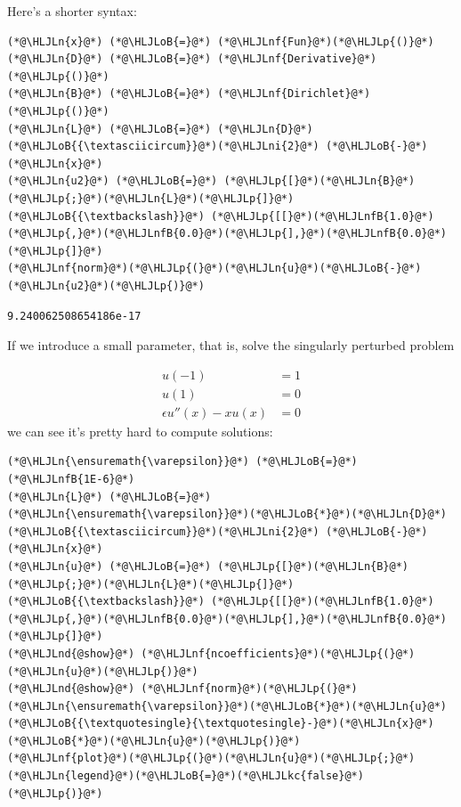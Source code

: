 \documentclass[12pt,a4paper]{article}
\newcommand{\HLJLkc}[1]{\textcolor[RGB]{59,151,46}{\textit{#1}}}
\newcommand{\HLJLn}[1]{#1}
\newcommand{\HLJLnd}[1]{\textcolor[RGB]{214,102,97}{#1}}
\newcommand{\HLJLnf}[1]{\textcolor[RGB]{66,102,213}{#1}}
\newcommand{\HLJLnfB}[1]{\textcolor[RGB]{59,151,46}{#1}}
\newcommand{\HLJLni}[1]{\textcolor[RGB]{59,151,46}{#1}}
\newcommand{\HLJLoB}[1]{\textcolor[RGB]{102,102,102}{\textbf{#1}}}
\newcommand{\HLJLp}[1]{#1}
\begin{document}
Here's a shorter syntax:


\begin{lstlisting}
(*@\HLJLn{x}@*) (*@\HLJLoB{=}@*) (*@\HLJLnf{Fun}@*)(*@\HLJLp{()}@*)
(*@\HLJLn{D}@*) (*@\HLJLoB{=}@*) (*@\HLJLnf{Derivative}@*)(*@\HLJLp{()}@*)
(*@\HLJLn{B}@*) (*@\HLJLoB{=}@*) (*@\HLJLnf{Dirichlet}@*)(*@\HLJLp{()}@*)
(*@\HLJLn{L}@*) (*@\HLJLoB{=}@*) (*@\HLJLn{D}@*)(*@\HLJLoB{{\textasciicircum}}@*)(*@\HLJLni{2}@*) (*@\HLJLoB{-}@*) (*@\HLJLn{x}@*)
(*@\HLJLn{u2}@*) (*@\HLJLoB{=}@*) (*@\HLJLp{[}@*)(*@\HLJLn{B}@*)(*@\HLJLp{;}@*)(*@\HLJLn{L}@*)(*@\HLJLp{]}@*) (*@\HLJLoB{{\textbackslash}}@*) (*@\HLJLp{[[}@*)(*@\HLJLnfB{1.0}@*)(*@\HLJLp{,}@*)(*@\HLJLnfB{0.0}@*)(*@\HLJLp{],}@*)(*@\HLJLnfB{0.0}@*)(*@\HLJLp{]}@*)
(*@\HLJLnf{norm}@*)(*@\HLJLp{(}@*)(*@\HLJLn{u}@*)(*@\HLJLoB{-}@*)(*@\HLJLn{u2}@*)(*@\HLJLp{)}@*)
\end{lstlisting}

\begin{lstlisting}
9.240062508654186e-17
\end{lstlisting}


If we introduce a small parameter, that is, solve the singularly perturbed problem


\begin{align*}
u(-1) &= 1\\
u(1) &= 0\\
\epsilon u''(x) - xu(x) &= 0
\end{align*}
we can see it's pretty hard to compute solutions:


\begin{lstlisting}
(*@\HLJLn{\ensuremath{\varepsilon}}@*) (*@\HLJLoB{=}@*) (*@\HLJLnfB{1E-6}@*)
(*@\HLJLn{L}@*) (*@\HLJLoB{=}@*) (*@\HLJLn{\ensuremath{\varepsilon}}@*)(*@\HLJLoB{*}@*)(*@\HLJLn{D}@*)(*@\HLJLoB{{\textasciicircum}}@*)(*@\HLJLni{2}@*) (*@\HLJLoB{-}@*) (*@\HLJLn{x}@*)
(*@\HLJLn{u}@*) (*@\HLJLoB{=}@*) (*@\HLJLp{[}@*)(*@\HLJLn{B}@*)(*@\HLJLp{;}@*)(*@\HLJLn{L}@*)(*@\HLJLp{]}@*) (*@\HLJLoB{{\textbackslash}}@*) (*@\HLJLp{[[}@*)(*@\HLJLnfB{1.0}@*)(*@\HLJLp{,}@*)(*@\HLJLnfB{0.0}@*)(*@\HLJLp{],}@*)(*@\HLJLnfB{0.0}@*)(*@\HLJLp{]}@*)
(*@\HLJLnd{@show}@*) (*@\HLJLnf{ncoefficients}@*)(*@\HLJLp{(}@*)(*@\HLJLn{u}@*)(*@\HLJLp{)}@*)
(*@\HLJLnd{@show}@*) (*@\HLJLnf{norm}@*)(*@\HLJLp{(}@*)(*@\HLJLn{\ensuremath{\varepsilon}}@*)(*@\HLJLoB{*}@*)(*@\HLJLn{u}@*)(*@\HLJLoB{{\textquotesingle}{\textquotesingle}-}@*)(*@\HLJLn{x}@*)(*@\HLJLoB{*}@*)(*@\HLJLn{u}@*)(*@\HLJLp{)}@*)
(*@\HLJLnf{plot}@*)(*@\HLJLp{(}@*)(*@\HLJLn{u}@*)(*@\HLJLp{;}@*) (*@\HLJLn{legend}@*)(*@\HLJLoB{=}@*)(*@\HLJLkc{false}@*)(*@\HLJLp{)}@*)
\end{lstlisting}
\end{document}
